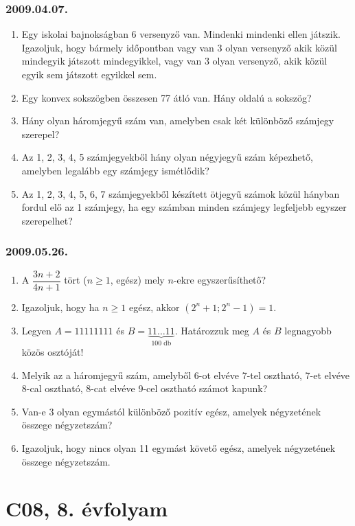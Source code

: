\subsection*{2009.04.07.}
\begin{enumerate}
\item Egy iskolai bajnokságban 6 versenyző van. Mindenki mindenki ellen játszik.
Igazoljuk, hogy bármely időpontban vagy van 3 olyan versenyző akik közül mindegyik játszott mindegyikkel, vagy van 3 olyan versenyző, akik közül egyik sem játszott egyikkel sem.
\item Egy konvex sokszögben összesen 77 átló van. Hány oldalú a sokszög?
\item Hány olyan háromjegyű szám van, amelyben csak két különböző számjegy szerepel?
\item Az 1, 2, 3, 4, 5 számjegyekből hány olyan négyjegyű szám képezhető, amelyben legalább egy számjegy ismétlődik?
\item Az 1, 2, 3, 4, 5, 6, 7 számjegyekből készített ötjegyű számok közül hányban fordul elő az 1 számjegy, ha egy számban minden számjegy legfeljebb egyszer szerepelhet?
\end{enumerate}

\subsection*{2009.05.26.}
\begin{enumerate}
\item A $\dfrac{3n+2}{4n+1}$ tört ($n\ge 1$, egész) mely $n$-ekre egyszerűsíthető?
\item Igazoljuk, hogy ha $n\ge 1$ egész, akkor $\left(2^n+1; 2^n-1\right)=1$.
\item Legyen $A=11111111$ és $B=\underbrace{11\ldots 11}_{100\text{~db}}$. Határozzuk meg $A$ és $B$ legnagyobb közös osztóját!
\item Melyik az a háromjegyű szám, amelyből 6-ot elvéve 7-tel osztható, 7-et elvéve 8-cal osztható, 8-cat elvéve 9-cel osztható számot kapunk?
\item Van-e 3 olyan egymástól különböző pozitív egész, amelyek négyzetének összege négyzetszám?
\item Igazoljuk, hogy nincs olyan 11 egymást követő egész, amelyek négyzetének összege négyzetszám.
\end{enumerate}

 
\chapter{C08, 8. évfolyam}
